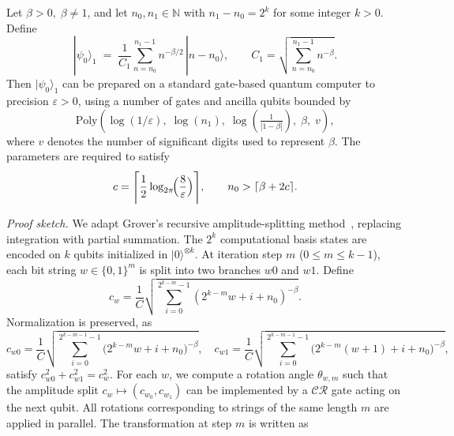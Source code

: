 \documentclass[aps,pra,twocolumn,superscriptaddress,preprintnumbers,amsmath,amssymb]{revtex4-2}
\begin{document}
\begin{theorem}\label{th:trusi}
    Let $\beta>0,\;\beta \neq 1$, and let $n_0,n_1\in\mathbb{N}$ with $n_1-n_0=2^k$ for some integer $k>0$. Define
    \begin{equation}
        |\psi_0 \rangle_1 \;=\; \frac{1}{C_1}\sum_{n=n_0}^{n_1-1} n^{-\beta/2}\,|n-n_0\rangle,
    \qquad 
        C_1=\sqrt{ \sum_{n=n_0}^{n_1-1} n^{-\beta}}.
    \end{equation}
    Then  $|\psi_0\rangle_1$ can be prepared on a standard gate-based quantum computer to precision $\varepsilon>0$, using a number of gates and ancilla qubits bounded by 
    \begin{equation}
        \mathrm{Poly}\!\left(\log(1/\varepsilon), \; \log(n_1), \; \log(\tfrac{1}{|1-\beta|}), \; \beta, \; v \right),
    \end{equation}
    where $v$ denotes the number of significant digits used to represent $\beta$. The parameters are required to satisfy
    \begin{equation}
        c = \Biggl\lceil \frac{1}{2}\log_{2\pi}\!\Bigl(\frac{8}{\varepsilon}\Bigr)\Biggr\rceil, 
        \qquad n_0 > \lceil \beta + 2c \rceil.
    \end{equation}
\end{theorem}
\noindent\textit{Proof sketch.}
We adapt Grover’s recursive amplitude-splitting method~\cite{grover2002creating}, replacing integration with partial summation.  The $2^k$ computational basis states are encoded on $k$ qubits initialized in $|0\rangle^{\otimes k}$. At iteration step $m$ ($0\le m\le k-1$), each bit string $w\in\{0,1\}^m$ is split into two branches $w0$ and $w1$. Define
\begin{equation}
    c_w=\frac{1}{C}\sqrt{\sum_{i=0}^{2^{k-m}-1}(2^{k-m}w+i+n_0)^{-\beta}}.
\end{equation}
Normalization is preserved, as
\begin{equation}
    c_{w0}=\frac{1}{C}\sqrt{\sum_{i=0}^{2^{k-m-1}-1}\!\bigl(2^{k-m}w+i+n_0\bigr)^{-\beta}}, 
    \quad
    c_{w1}=\frac{1}{C}\sqrt{\sum_{i=0}^{2^{k-m-1}-1}\!\bigl(2^{k-m}(w+1)+i+n_0\bigr)^{-\beta}},
\end{equation}
satisfy $c_{w0}^2+c_{w1}^2=c_w^2$. For each $w$, we compute a rotation angle $\theta_{w,m}$ such that the amplitude split $c_w\mapsto (c_{w_0},c_{w_1})$ can be implemented by a $\mathcal{CR}$ gate acting on the next qubit. All rotations corresponding to strings  of the same length $m$ are applied in parallel. 
The transformation at step $m$ is written as
\end{document}
